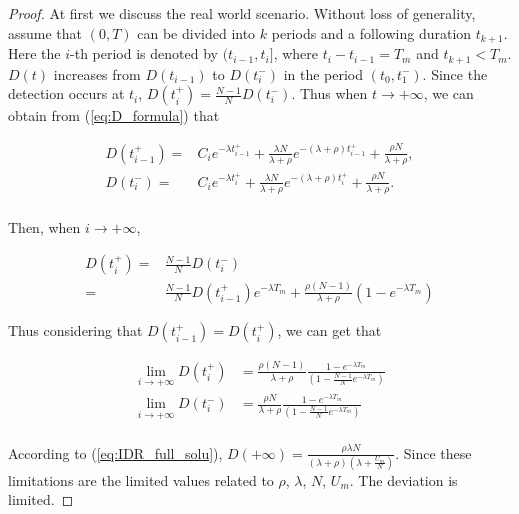 \begin{proof}
At first we discuss the real world scenario.
Without loss of generality,
assume that $(0, T)$ can be divided into $k$ periods
and a following duration $t_{k+1}$.
Here the $i$-th period is denoted by $(t_{i-1}, t_{i}]$,
where $t_{i} - t_{i-1} = T_{m}$ and $t_{k+1} < T_{m}$.
$D(t)$ increases from $D(t_{i-1})$ to $D(t_{i}^{-})$
in the period $(t_{0}, t_{1}^{-})$.
Since the detection occurs at $t_{i}$,
$D(t_{i}^{+}) = \frac{N-1}{N}D(t_{i}^{-})$.
Thus when $t \rightarrow +\infty$,
we can obtain from (\ref{eq:D_formula}) that
\begin{small}
\begin{equation}
\nonumber
\begin{aligned}
D(t_{i-1}^{+}) = & C_{i} e^{-\lambda t_{i-1}^{+}}
+ \frac{\lambda N}{\lambda + \rho} e^{-(\lambda+\rho)t_{i-1}^{+}}
+ \frac{\rho N}{\lambda+\rho}, \\
D(t_{i}^{-}) = & C_{i} e^{-\lambda t_{i}^{+}}
+ \frac{\lambda N}{\lambda + \rho} e^{-(\lambda+\rho)t_{i}^{+}}
+ \frac{\rho N}{\lambda+\rho}. \\
\end{aligned}
\end{equation}
\end{small}
Then, when $i \rightarrow +\infty$,
\begin{small}
\begin{equation}
\nonumber
\begin{aligned}
D(t_{i}^{+}) =& \frac{N-1}{N} D(t_{i}^{-}) \\
=& \frac{N-1}{N} D(t_{i-1}^{+}) e^{-\lambda T_{m}}
+ \frac{\rho (N-1)}{\lambda + \rho} (1 - e^{-\lambda T_{m}})
\end{aligned}
\end{equation}
\end{small}
Thus considering that $D(t_{i-1}^{+}) = D(t_{i}^{+})$, we can get that
\begin{small}
\begin{equation}
\nonumber
\begin{aligned}
\lim_{i \rightarrow +\infty} D(t_{i}^{+}) &=
\frac{\rho(N-1)}{\lambda+\rho} \frac{1 - e^{-\lambda T_{m}}}
{(1 - \frac{N-1}{N}e^{-\lambda T_{m}})} \\
\lim_{i \rightarrow +\infty} D(t_{i}^{-}) &=
\frac{\rho N}{\lambda+\rho} \frac{1 - e^{-\lambda T_{m}}}
{(1 - \frac{N-1}{N}e^{-\lambda T_{m}})} \\
\end{aligned}
\end{equation}
\end{small}
According to (\ref{eq:IDR_full_solu}),
$D(+\infty) = \frac{\rho \lambda N}
{(\lambda + \rho)(\lambda + \frac{U_{m}}{N})}$.
Since these limitations are the limited values related to
$\rho$, $\lambda$, $N$, $U_{m}$.
The deviation is limited.
\end{proof}

